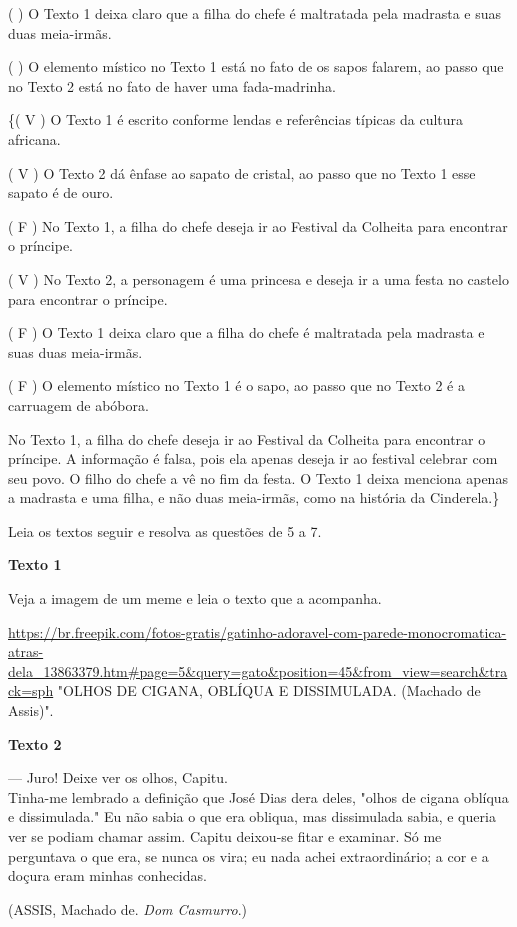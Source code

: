 ( ) O Texto 1 deixa claro que a filha do chefe é maltratada pela
madrasta e suas duas meia-irmãs.

( ) O elemento místico no Texto 1 está no fato de os sapos falarem, ao
passo que no Texto 2 está no fato de haver uma fada-madrinha.

\coment

\{( V ) O Texto 1 é escrito conforme lendas e referências típicas da
cultura africana.

( V ) O Texto 2 dá ênfase ao sapato de cristal, ao passo que no Texto 1
esse sapato é de ouro.

( F ) No Texto 1, a filha do chefe deseja ir ao Festival da Colheita
para encontrar o príncipe.

( V ) No Texto 2, a personagem é uma princesa e deseja ir a uma festa no
castelo para encontrar o príncipe.

( F ) O Texto 1 deixa claro que a filha do chefe é maltratada pela
madrasta e suas duas meia-irmãs.

( F ) O elemento místico no Texto 1 é o sapo, ao passo que no Texto 2 é
a carruagem de abóbora.

No Texto 1, a filha do chefe deseja ir ao Festival da Colheita para
encontrar o príncipe. A informação é falsa, pois ela apenas deseja ir ao
festival celebrar com seu povo. O filho do chefe a vê no fim da festa. O
Texto 1 deixa menciona apenas a madrasta e uma filha, e não duas
meia-irmãs, como na história da Cinderela.\}

Leia os textos seguir e resolva as questões de 5 a 7.

\textbf{Texto 1}

Veja a imagem de um meme e leia o texto que a acompanha.

\url{https://br.freepik.com/fotos-gratis/gatinho-adoravel-com-parede-monocromatica-atras-dela_13863379.htm\#page=5\&query=gato\&position=45\&from_view=search\&track=sph}
"OLHOS DE CIGANA, OBLÍQUA E DISSIMULADA. (Machado de Assis)".

\textbf{Texto 2}

--- Juro! Deixe ver os olhos, Capitu.\\
Tinha-me lembrado a definição que José Dias dera deles, "olhos de cigana
oblíqua e dissimulada." Eu não sabia o que era obliqua, mas dissimulada
sabia, e queria ver se podiam chamar assim. Capitu deixou-se fitar e
examinar. Só me perguntava o que era, se nunca os vira; eu nada achei
extraordinário; a cor e a doçura eram minhas conhecidas.

(ASSIS, Machado de. \emph{Dom Casmurro}.)

